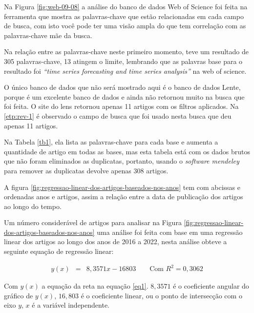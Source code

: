


Na Figura \ref{fig:web-09-08} a análise do banco de dados Web of Science foi feita na ferramenta que mostra as palavras-chave que estão relacionadas em cada campo de busca, com isto você pode ter uma visão ampla do que tem correlação com as palavras-chave mãe da busca.

Na relação entre as palavras-chave neste primeiro momento, teve um resultado de 305 palavras-chave, 13 atingem o limite, lembrando que as palavras base para o resultado foi \textit{``time series forecasting and time series analysis''} na web of science.

O único banco de dados que não será mostrado aqui é o banco de dados Lente, porque é um excelente banco de dados e ainda não retornou muito na busca que foi feita. O site do lens retornou apenas 11 artigos com os filtros aplicados. Na \ref{etp:rev-1} é observado o campo de busca que foi usado nesta busca que deu apenas 11 artigos.






Na Tabela \ref{tb1}, ela lista as palavras-chave para cada base e aumenta a quantidade de artigo em todas as bases, mas esta tabela está com os dados brutos que não foram eliminados as duplicatas, portanto, usando o \textit{software mendeley} para remover as duplicatas devolve apenas 308 artigos.






A figura \ref{fig:regressao-linear-dos-artigos-baseados-nos-anos} tem com abcissas e ordenadas anos e artigos, assim a relação entre a data de publicação dos artigos ao longo do tempo.

Um número considerável de artigos para analisar na Figura \ref{fig:regressao-linear-dos-artigos-baseados-nos-anos} uma análise foi feita com base em uma regressão linear dos artigos ao longo dos anos de 2016 a 2022, nesta análise obteve a seguinte equação de regressão linear:


\begin{eqnarray}
	y(x)&=&8,3571x - 16803 \qquad \text{Com } R^2=0,3062\label{eq1}
\end{eqnarray}

Com $y(x)$ a equação da reta na equação \eqref{eq1}. $8,3571$ é o coeficiente angular do gráfico de $ y(x)$, $16,803$ é o coeficiente linear, ou o ponto de intersecção com o eixo $y$, $x$ é a variável independente.

